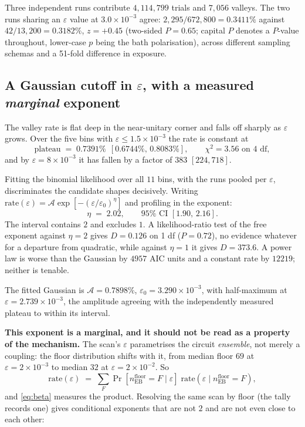 \documentclass[11pt,a4paper]{article}
\theoremstyle{definition}
\theoremstyle{remark}
\newcommand{\floor}{n_{\mathrm{EB}}^{\mathrm{floor}}}
\begin{document}
Three independent runs contribute $4{,}114{,}799$ trials and $7{,}056$ valleys. The two runs sharing an $\varepsilon$ value at $3.0\times10^{-3}$ agree: $2{,}295/672{,}800 = 0.3411\%$ against $42/13{,}200 = 0.3182\%$, $z = +0.45$ (two-sided $P = 0.65$; capital $P$ denotes a $P$-value throughout, lower-case $p$ being the bath polarisation), across different sampling schemas and a 51-fold difference in exposure.

\subsection{\texorpdfstring{A Gaussian cutoff in $\varepsilon$, with a measured \emph{marginal} exponent}{A Gaussian cutoff in epsilon, with a measured marginal exponent}}\label{sec:cutoff}

The valley rate is flat deep in the near-unitary corner and falls off sharply as $\varepsilon$ grows. Over the five bins with $\varepsilon \le 1.5\times10^{-3}$ the rate is constant at
\[
  \text{plateau} \;=\; 0.7391\%\ \ [0.6744\%,\, 0.8083\%], \qquad \chi^2 = 3.56 \text{ on } 4 \text{ df},
\]
and by $\varepsilon = 8\times10^{-3}$ it has fallen by a factor of $383$ $[224, 718]$.

Fitting the binomial likelihood over all $11$ bins, with the runs pooled per $\varepsilon$, discriminates the candidate shapes decisively. Writing $\text{rate}(\varepsilon) = \mathcal{A}\exp[-(\varepsilon/\varepsilon_0)^\eta]$ and profiling in the exponent:
\begin{equation}\label{eq:beta}
  \eta \;=\; 2.02, \qquad 95\% \text{ CI } [1.90,\, 2.16].
\end{equation}
The interval contains $2$ and excludes $1$. A likelihood-ratio test of the free exponent against $\eta = 2$ gives $D = 0.126$ on 1 df ($P = 0.72$), no evidence whatever for a departure from quadratic, while against $\eta = 1$ it gives $D = 373.6$. A power law is worse than the Gaussian by $4957$ AIC units and a constant rate by $12219$; neither is tenable.

The fitted Gaussian is $\mathcal{A} = 0.7898\%$, $\varepsilon_0 = 3.290\times10^{-3}$, with half-maximum at $\varepsilon = 2.739\times10^{-3}$, the amplitude agreeing with the independently measured plateau to within its interval.

\textbf{This exponent is a marginal, and it should not be read as a property of the mechanism.} The scan's $\varepsilon$ parametrises the circuit \emph{ensemble}, not merely a coupling: the floor distribution shifts with it, from median floor $69$ at $\varepsilon = 2\times10^{-3}$ to median $32$ at $\varepsilon = 2\times10^{-2}$. So
\[
  \text{rate}(\varepsilon) \;=\; \sum_F \Pr[\floor = F \mid \varepsilon]\;\text{rate}(\varepsilon \mid \floor = F),
\]
and \eqref{eq:beta} measures the product. Resolving the same scan by floor (the tally records one) gives conditional exponents that are not $2$ and are not even close to each other:
\end{document}

